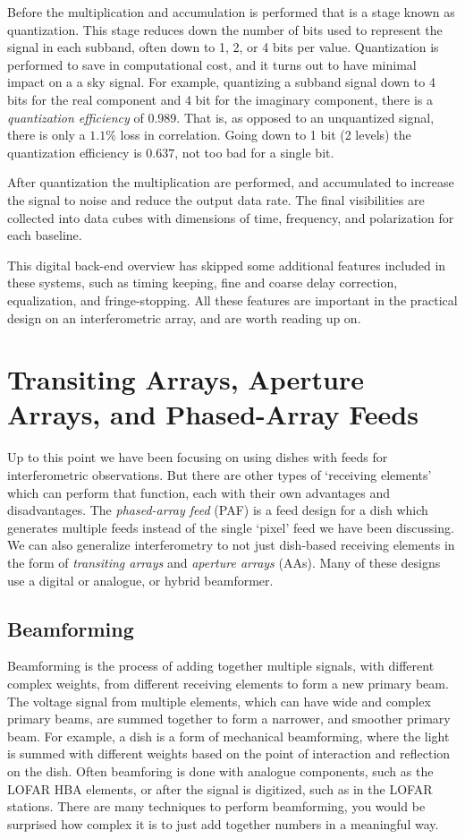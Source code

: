 \documentclass[usenatbib,usegraphicx]{article}
\begin{document}
Before the multiplication and accumulation is performed that is a stage known as quantization.
This stage reduces down the number of bits used to represent the signal in each subband, often down to 1, 2, or 4 bits per value.
Quantization is performed to save in computational cost, and it turns out to have minimal impact on a a sky signal.
For example, quantizing a subband signal down to 4 bits for the real component and 4 bit for the imaginary component, there is a \emph{quantization efficiency} of 0.989.
That is, as opposed to an unquantized signal, there is only a $1.1\%$ loss in correlation.
Going down to 1 bit (2 levels) the quantization efficiency is $0.637$, not too bad for a single bit.

After quantization the multiplication are performed, and accumulated to increase the signal to noise and reduce the output data rate.
The final visibilities are collected into data cubes with dimensions of time, frequency, and polarization for each baseline.

This digital back-end overview has skipped some additional features included in these systems, such as timing keeping, fine and coarse delay correction, equalization, and fringe-stopping.
All these features are important in the practical design on an interferometric array, and are worth reading up on.

\section{Transiting Arrays, Aperture Arrays, and Phased-Array Feeds}

Up to this point we have been focusing on using dishes with feeds for interferometric observations.
But there are other types of `receiving elements' which can perform that function, each with their own advantages and disadvantages.
The \emph{phased-array feed} (PAF) is a feed design for a dish which generates multiple feeds instead of the single `pixel' feed we have been discussing.
We can also generalize interferometry to not just dish-based receiving elements in the form of \emph{transiting arrays} and \emph{aperture arrays} (AAs).
Many of these designs use a digital or analogue, or hybrid beamformer.

\subsection{Beamforming}

Beamforming is the process of adding together multiple signals, with different complex weights, from different receiving elements to form a new primary beam.
The voltage signal from multiple elements, which can have wide and complex primary beams, are summed together to form a narrower, and smoother primary beam.
For example, a dish is a form of mechanical beamforming, where the light is summed with different weights based on the point of interaction and reflection on the dish.
Often beamforing is done with analogue components, such as the LOFAR HBA elements, or after the signal is digitized, such as in the LOFAR stations.
There are many techniques to perform beamforming, you would be surprised how complex it is to just add together numbers in a meaningful way.
\end{document}
